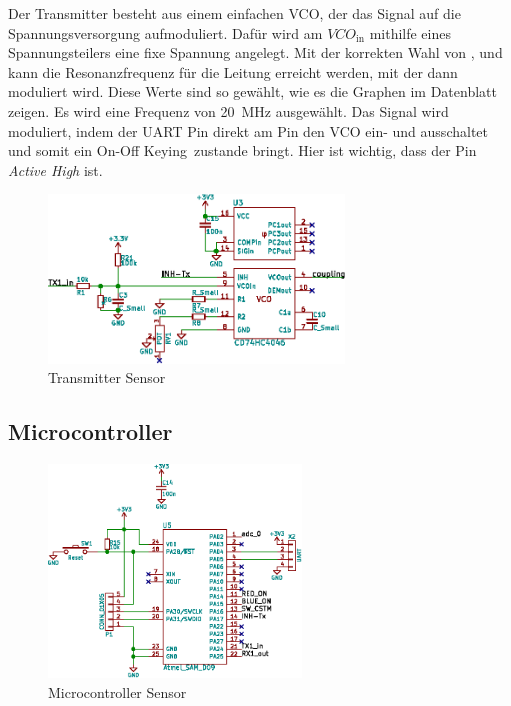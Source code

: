 Der  Transmitter  besteht  aus  einem   einfachen  VCO,  der  das  Signal  auf
die  Spannungsversorgung aufmoduliert.   Daf\"ur  wird am  $VCO_{\mathrm{in}}$
mithilfe eines Spannungsteilers eine fixe Spannung angelegt. Mit der korrekten
Wahl von ,   und  kann  die Resonanzfrequenz f\"ur
die Leitung erreicht werden, mit der  dann moduliert wird. Diese Werte sind so
gew\"ahlt,  wie es  die  Graphen im  Datenblatt \cite{ref:ti:cd54}  zeigen. Es
wird  eine Frequenz  von  \SI{20}{\mega\hertz}  ausgew\"ahlt. Das Signal  wird
moduliert, indem der UART  Pin  direkt am  Pin den VCO ein-
und  ausschaltet  und  somit  ein  On-Off  Keying zustande  bringt. Hier  ist
wichtig, dass der Pin \emph{Active High} ist.

\begin{figure}[h!t]
    \centering
    \includegraphics[width=0.70\textwidth]{images/sensor-sch/sensor--sch--transmitter.eps}
    \caption[Sensor: Schema Transmitter]{Transmitter Sensor}
\end{figure}


\subsection{Microcontroller}
\label{subsec:hw:sensor:mcu}

\begin{figure}
    \centering
    \includegraphics[width=0.60\textwidth]{images/sensor-sch/sensor--sch--mcu.eps}
    \caption[Sensor: Schema Microcontroller]{Microcontroller Sensor}
\end{figure}

